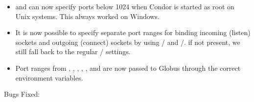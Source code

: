 \begin{itemize}
\item {} and  can now specify ports
below 1024 when Condor is started as root on Unix systems.  This
always worked on Windows.

\item It is now possible to specify separate port ranges for
binding incoming (listen) sockets and outgoing (connect) sockets
by using / and
/. if not present, we
still fall back to the regular /
settings.

\item Port ranges from , ,
, , , and
 are now passed to Globus through the correct
environment variables.



\end{itemize}

\noindent Bugs Fixed:

